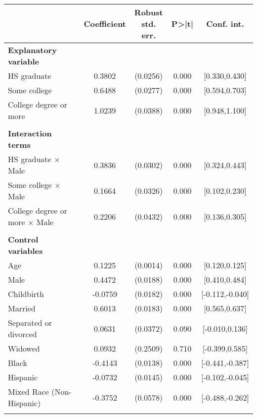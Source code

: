 {
\def\sym#1{\ifmmode^{#1}\else\(^{#1}\)\fi}
\begin{tabular}{l*{1}{cccc}}
\toprule
                    & Coefficient&\shortstack{Robust\\std. err.}&       P>|t|&  Conf. int.\\
\midrule
\textbf{Explanatory variable}&            &            &            &            \\
HS graduate         &      0.3802&    (0.0256)&       0.000&[0.330,0.430]\\
Some college        &      0.6488&    (0.0277)&       0.000&[0.594,0.703]\\
College degree or more&      1.0239&    (0.0388)&       0.000&[0.948,1.100]\\
\\ \textbf{Interaction terms}&            &            &            &            \\
HS graduate $\times$ Male&      0.3836&    (0.0302)&       0.000&[0.324,0.443]\\
Some college $\times$ Male&      0.1664&    (0.0326)&       0.000&[0.102,0.230]\\
College degree or more $\times$ Male&      0.2206&    (0.0432)&       0.000&[0.136,0.305]\\
\\ \textbf{Control variables}&            &            &            &            \\
Age                 &      0.1225&    (0.0014)&       0.000&[0.120,0.125]\\
Male                &      0.4472&    (0.0188)&       0.000&[0.410,0.484]\\
Childbirth          &     -0.0759&    (0.0182)&       0.000&[-0.112,-0.040]\\
Married             &      0.6013&    (0.0183)&       0.000&[0.565,0.637]\\
Separated or divorced&      0.0631&    (0.0372)&       0.090&[-0.010,0.136]\\
Widowed             &      0.0932&    (0.2509)&       0.710&[-0.399,0.585]\\
Black               &     -0.4143&    (0.0138)&       0.000&[-0.441,-0.387]\\
Hispanic            &     -0.0732&    (0.0145)&       0.000&[-0.102,-0.045]\\
Mixed Race (Non-Hispanic)&     -0.3752&    (0.0578)&       0.000&[-0.488,-0.262]\\
                    &            &            &            &            \\

\end{tabular}}
